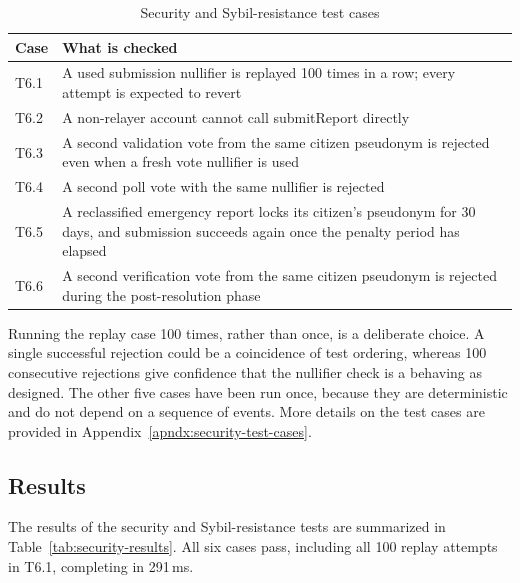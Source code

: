 \begin{table}[htbp]
\centering
\caption{Security and Sybil-resistance test cases}
\label{tab:security-cases}
\begin{tabular}{p{}|p{}}
    
    Case & What is checked \\
    \hline
    T6.1 & A used submission nullifier is replayed 100 times in a row; every attempt is expected to revert \\
    \hline
    T6.2 & A non-relayer account cannot call submitReport directly \\
    \hline
    T6.3 & A second validation vote from the same citizen pseudonym is rejected even when a fresh vote nullifier is used \\
    \hline
    T6.4 & A second poll vote with the same nullifier is rejected \\
    \hline
    T6.5 & A reclassified emergency report locks its citizen's pseudonym for 30 days, and submission succeeds again once the penalty period has elapsed \\
    \hline
    T6.6 & A second verification vote from the same citizen pseudonym is rejected during the post-resolution phase \\
    
\end{tabular}
\end{table}

Running the replay case 100 times, rather than once, is a deliberate choice. A single successful rejection could be a coincidence of test ordering, whereas 100 consecutive rejections give confidence that the nullifier check is a behaving as designed. The other five cases have been run once, because they are deterministic and do not depend on a sequence of events. More details on the test cases are provided in Appendix~\ref{apndx:security-test-cases}. 

\subsection{Results}

The results of the security and Sybil-resistance tests are summarized in Table~\ref{tab:security-results}. All six cases pass, including all 100 replay attempts in T6.1, completing in 291\,ms.


